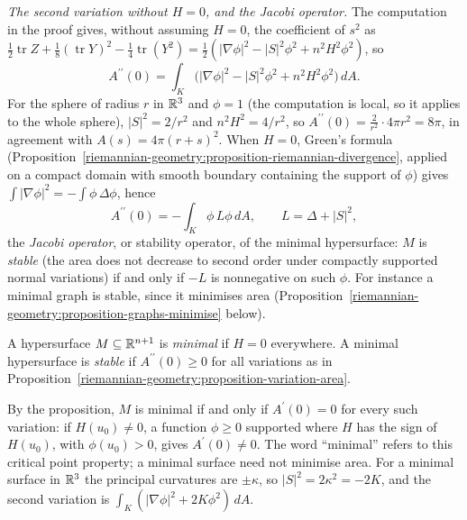 \begin{remark}\label{riemannian-geometry:remark-second-variation-general}
\emph{The second variation without $H = 0$, and the Jacobi operator.} The computation in the proof gives, without assuming $H = 0$, the coefficient of $s^2$ as
$\frac12\operatorname{tr}Z + \frac18(\operatorname{tr}Y)^2 - \frac14\operatorname{tr}(Y^2) = \frac12(|\nabla\phi|^2 - |S|^2\phi^2 + n^2H^2\phi^2)$, so
\[
A^{\prime\prime}(0) = \int_K\bigl(|\nabla\phi|^2 - |S|^2\phi^2 + n^2H^2\phi^2\bigr)\,dA .
\]
For the sphere of radius $r$ in $\mathbb{R}^3$ and $\phi = 1$ (the computation is local, so it applies to the whole sphere), $|S|^2 = 2/r^2$ and $n^2H^2 = 4/r^2$, so $A^{\prime\prime}(0) = \frac{2}{r^2} \cdot 4\pi r^2 = 8\pi$,
in agreement with $A(s) = 4\pi(r + s)^2$. When $H = 0$, Green's formula (Proposition~\ref{riemannian-geometry:proposition-riemannian-divergence}, applied on a compact domain with smooth boundary
containing the support of $\phi$) gives $\int|\nabla\phi|^2 = -\int\phi\,\Delta\phi$, hence
\[
A^{\prime\prime}(0) = -\int_K\phi\,L\phi\,dA, \qquad L = \Delta + |S|^2,
\]
the \emph{Jacobi operator}, or stability operator, of the minimal hypersurface: $M$ is \emph{stable} (the area does not decrease to second order under compactly supported normal variations) if and only if
$-L$ is nonnegative on such $\phi$. For instance a minimal graph is stable, since it minimises area (Proposition~\ref{riemannian-geometry:proposition-graphs-minimise} below).
\end{remark}

\begin{definition}\label{riemannian-geometry:definition-minimal}
A hypersurface $M \subseteq \mathbb{R}^{n+1}$ is \emph{minimal} if $H = 0$ everywhere. A minimal hypersurface is \emph{stable} if $A^{\prime\prime}(0) \geq 0$ for all variations as in
Proposition~\ref{riemannian-geometry:proposition-variation-area}.
\end{definition}

By the proposition, $M$ is minimal if and only if $A^{\prime}(0) = 0$ for every such variation: if $H(u_0) \neq 0$, a function $\phi \geq 0$ supported where $H$ has the sign of
$H(u_0)$, with $\phi(u_0) > 0$, gives $A^{\prime}(0) \neq 0$. The word ``minimal'' refers to this critical point property; a minimal surface need not minimise area. For a
minimal surface in $\mathbb{R}^3$ the principal curvatures are $\pm\kappa$, so $|S|^2 = 2\kappa^2 = -2K$, and the second variation is $\int_K(|\nabla\phi|^2 + 2K\phi^2)\,dA$.

